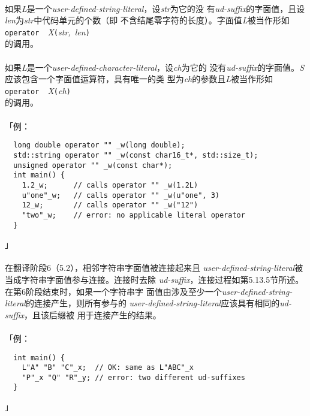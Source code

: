 \paragraph{}
如果\textit{L}是一个\textit{user-defined-string-literal}，设\textit{str}为它的没
有\textit{ud-suffix}的字面值，且设\textit{len}为\textit{str}中代码单元的个数（即
不含结尾零字符的长度）。字面值\textit{L}被当作形如                            \\
\mbox{\qquad\texttt{operator \qdbl\qdbl}\
  \textit{X}\texttt{(}\textit{str, len}\texttt{)}}                            \\
的调用。

\paragraph{}
如果\textit{L}是一个\textit{user-defined-character-literal}，设\textit{ch}为它的
没有\textit{ud-suffix}的字面值。\textit{S}应该包含一个字面值运算符，具有唯一的类
型为\textit{ch}的参数且\textit{L}被当作形如                                   \\
\mbox{\qquad\texttt{operator \qdbl\qdbl}\
  \textit{X}\texttt{(}\textit{ch}\texttt{)}}                                  \\
的调用。

\paragraph{}
「例：
\begin{lstlisting}
  long double operator "" _w(long double);
  std::string operator "" _w(const char16_t*, std::size_t);
  unsigned operator "" _w(const char*);
  int main() {
    1.2_w;      // calls operator "" _w(1.2L)
    u"one"_w;   // calls operator "" _w(u"one", 3)
    12_w;       // calls operator "" _w("12")
    "two"_w;    // error: no applicable literal operator
  }
\end{lstlisting}」

\paragraph{}
在翻译阶段6（5.2），相邻字符串字面值被连接起来且
\textit{user-defined-string-literal}被当成字符串字面值参与连接。连接时去除
\textit{ud-suffix}，连接过程如第5.13.5节所述。在第6阶段结束时，如果一个字符串字
面值由涉及至少一个\textit{user-defined-string-literal}的连接产生，则所有参与的
\textit{user-defined-string-literal}应该具有相同的\textit{ud-suffix}，且该后缀被
用于连接产生的结果。

\paragraph{}
「例：
\begin{lstlisting}
  int main() {
    L"A" "B" "C"_x;  // OK: same as L"ABC"_x
    "P"_x "Q" "R"_y; // error: two different ud-suffixes
  }
\end{lstlisting}」
